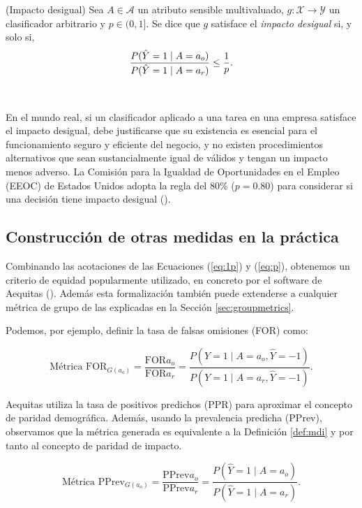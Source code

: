 \documentclass[oneside,openright,titlepage,numbers=noenddot,openany,headinclude,footinclude=true,
cleardoublepage=empty,abstractoff,BCOR=5mm,paper=a4,fontsize=12pt,main=spanish]{scrreprt}
\begin{document}
\begin{definition}(Impacto desigual) \label{def:mdi}
Sea $A \in \mathcal{A}$ un atributo sensible multivaluado, $g\colon \mathcal{X} \to \mathcal{Y}$ un clasificador arbitrario y $p\in (0,1]$. Se dice que $g$ satisface el \textit{impacto desigual} si, y solo si,
\begin{equation} \label{eq:1p}
    \frac{\displaystyle P(\hat{Y}=1 \mid A=a_o)}{\displaystyle P(\hat{Y}=1 \mid A=a_r)}\leq \frac{1}{p}.
\end{equation}
\end{definition}\

En el mundo real, si un clasificador aplicado a una tarea en una empresa satisface el impacto desigual, debe justificarse que su existencia es esencial para el funcionamiento seguro y eficiente del negocio, y no existen procedimientos alternativos que sean sustancialmente igual de válidos y tengan un impacto menos adverso. La Comisión para la Igualdad de Oportunidades en el Empleo (EEOC) de Estados Unidos adopta la regla del $80\%$ ($p = 0.80$) para considerar si una decisión tiene impacto desigual (\cite{adverse2009}).

\subsection*{Construcción de otras medidas en la práctica}

Combinando las acotaciones de las Ecuaciones (\ref{eq:1p}) y (\ref{eq:p}), obtenemos un criterio de equidad popularmente utilizado, en concreto por el software de Aequitas (\cite{aequitas2019}). Además esta formalización también puede extenderse a cualquier métrica de grupo de las explicadas en la Sección \ref{sec:groupmetrics}.

Podemos, por ejemplo, definir la tasa de falsas omisiones (FOR) como:

\begin{equation*} 
\text{Métrica FOR}_{G(a_o)} =\frac{\text{FOR}{a_o}}{\text{FOR}{a_r}}=\frac{P(Y=1 \mid A=a_o, \hat{Y}=-1)}{P(Y=1 \mid A=a_r, \hat{Y}=-1)}.
\end{equation*}

Aequitas utiliza la tasa de positivos predichos (PPR) para aproximar el concepto de paridad demográfica. Además, usando la prevalencia predicha (PPrev), observamos que la métrica generada es equivalente a la Definición \ref{def:mdi} y por tanto al concepto de paridad de impacto.

\begin{equation*} 
\text{Métrica PPrev}_{G(a_o)}=\frac{\text{PPrev}{a_o}}{\text{PPrev}{a_r}}=\frac{P(\hat{Y}=1 \mid A=a_o)}{P(\hat{Y}=1 \mid A=a_r)}.
\end{equation*}
\end{document}
